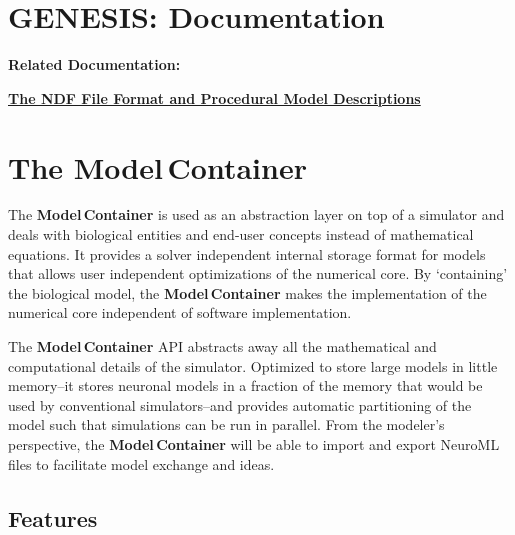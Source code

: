 \documentclass[12pt]{article}
\begin{document}
\section*{GENESIS: Documentation}

{\bf Related Documentation:}

\href{../ndf-procedural-description/ndf-procedural-description.tex}{\bf The NDF File Format and Procedural Model Descriptions}


\section*{The Model\,Container}

The {\bf Model\,Container} is used as an abstraction layer on top of a simulator and deals with biological entities and end-user concepts instead of mathematical equations. It provides a solver independent internal storage format for models that allows user independent optimizations of the numerical core. By `containing' the biological model, the {\bf Model\,Container} makes the implementation of the numerical core independent of software implementation.

The {\bf Model\,Container} API abstracts away all the mathematical and computational details of the simulator. Optimized to store large models in little memory--it stores neuronal models in a fraction of the memory that would be used by conventional simulators--and provides automatic partitioning of the model such that simulations can be run in parallel. From the modeler's perspective, the {\bf Model\,Container} will be able to import and export NeuroML files to facilitate model exchange and ideas.

\subsection*{Features}
\end{document}
